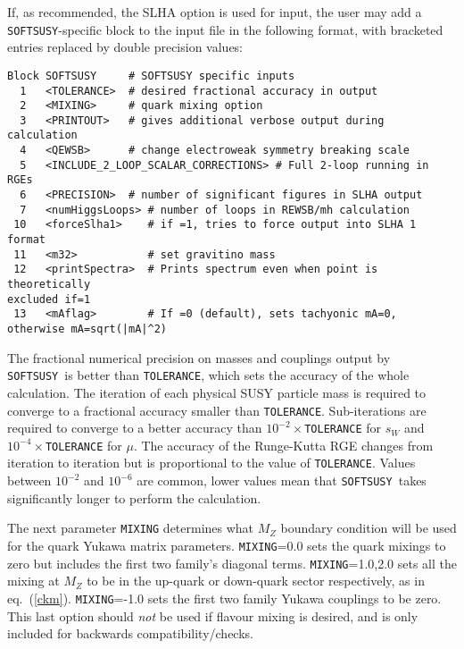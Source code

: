 \documentclass[]{article}
\def\SOFTSUSY{{\tt SOFTSUSY}}
\def\code#1{\small{\tt #1}\normalsize}
\begin{document}
If, as recommended, the SLHA option is used for input, the user may
add
a \SOFTSUSY-specific block to the input file in the following format, with
bracketed entries replaced by double precision values:
\small
\begin{verbatim}
Block SOFTSUSY     # SOFTSUSY specific inputs
  1   <TOLERANCE>  # desired fractional accuracy in output
  2   <MIXING>     # quark mixing option
  3   <PRINTOUT>   # gives additional verbose output during calculation
  4   <QEWSB>      # change electroweak symmetry breaking scale
  5   <INCLUDE_2_LOOP_SCALAR_CORRECTIONS> # Full 2-loop running in RGEs
  6   <PRECISION>  # number of significant figures in SLHA output
  7   <numHiggsLoops> # number of loops in REWSB/mh calculation
 10   <forceSlha1>    # if =1, tries to force output into SLHA 1 format
 11   <m32>           # set gravitino mass
 12   <printSpectra>  # Prints spectrum even when point is theoretically
excluded if=1
 13   <mAflag>        # If =0 (default), sets tachyonic mA=0, otherwise mA=sqrt(|mA|^2)
\end{verbatim}
\normalsize
The fractional numerical precision on masses and couplings output by \SOFTSUSY~is better than \code{TOLERANCE}, which
sets the accuracy of the whole calculation. The iteration of
each physical SUSY particle mass is required to converge to a
fractional accuracy smaller than \code{TOLERANCE}. Sub-iterations are required
to converge to a better accuracy than $10^{-2}\times$\code{TOLERANCE} for
$s_W$ and 
$10^{-4}\times$\code{TOLERANCE} for $\mu$. The accuracy of the Runge-Kutta RGE
changes from iteration to iteration but is proportional to the value of 
\code{TOLERANCE}. Values between $10^{-2}$ and $10^{-6}$ are common, lower
values  
mean that \SOFTSUSY~takes significantly longer to perform the calculation.

The next parameter
\code{MIXING} determines what $M_Z$ boundary condition will be used for the
quark Yukawa matrix parameters.
\code{MIXING}=0.0 sets the quark mixings to zero but includes the first two 
family's diagonal terms.
\code{MIXING}=1.0,2.0 sets all the mixing at $M_Z$
to be in the up-quark or down-quark
sector respectively, as in eq.~(\ref{ckm}).
\code{MIXING}=-1.0 sets the first two family Yukawa couplings to be zero. This
last option should {\em not}\/ be used if flavour mixing is desired, and is
only included for backwards compatibility/checks.
\end{document}
